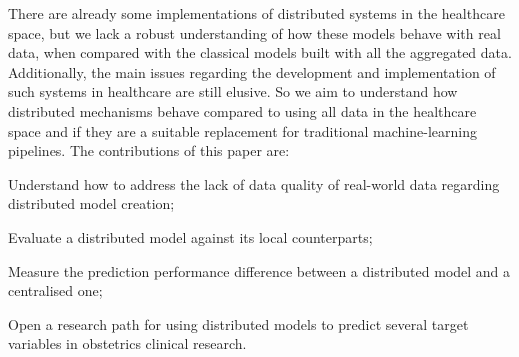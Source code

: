 There are already some implementations of distributed systems in the healthcare space, but we lack a robust understanding of how these models behave with real data, when compared with the classical models built with all the aggregated data. Additionally, the main issues regarding the development and implementation of such systems in healthcare are still elusive.
So we aim to understand how distributed mechanisms behave compared to using all data in the healthcare space and if they are a suitable replacement for traditional machine-learning pipelines. The contributions of this paper are:
\begin{myitemize}
    \item Understand how to address the lack of data quality of real-world data regarding distributed model creation;
    \item Evaluate a distributed model against its local counterparts;
    \item Measure the prediction performance difference between a distributed model and a centralised one;
    \item Open a research path for using distributed models to predict several target variables in obstetrics clinical research.
\end{myitemize}

